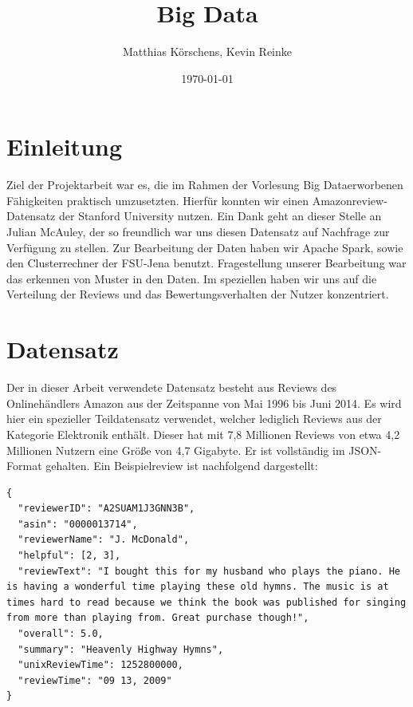 \documentclass{scrartcl}
\theoremstyle{my_th_style}
\begin{document}
\subject{Projektarbeit}%
\title{Big Data}%
\author{Matthias Körschens, Kevin Reinke}%
\date{\today}%
\maketitle%
\tableofcontents
\begingroup
\let\cleardoublepage\relax
\section{Einleitung}
Ziel der Projektarbeit war es, die im Rahmen der Vorlesung \glqq Big Data\grqq erworbenen Fähigkeiten praktisch umzusetzten. Hierfür konnten wir einen Amazonreview-Datensatz der Stanford University nutzen. Ein Dank geht an dieser Stelle an Julian McAuley, der so freundlich war uns diesen Datensatz auf Nachfrage zur Verfügung zu stellen. Zur Bearbeitung der Daten haben wir Apache Spark, sowie den Clusterrechner der FSU-Jena benutzt. Fragestellung unserer Bearbeitung war das erkennen von Muster in den Daten. Im speziellen haben wir uns auf die Verteilung der Reviews und das Bewertungsverhalten der Nutzer konzentriert.
\section{Datensatz}
Der in dieser Arbeit verwendete Datensatz besteht aus Reviews des Onlinehändlers Amazon aus der Zeitspanne von Mai 1996 bis Juni 2014. Es wird hier ein spezieller Teildatensatz verwendet, welcher lediglich Reviews aus der Kategorie Elektronik enthält. Dieser hat mit 7,8 Millionen Reviews von etwa 4,2 Millionen Nutzern eine Größe von 4,7 Gigabyte. Er ist vollständig im JSON-Format gehalten. Ein Beispielreview ist nachfolgend dargestellt:

\begin{lstlisting}[breaklines=true]
{ 
  "reviewerID": "A2SUAM1J3GNN3B", 
  "asin": "0000013714", 
  "reviewerName": "J. McDonald", 
  "helpful": [2, 3], 
  "reviewText": "I bought this for my husband who plays the piano. He is having a wonderful time playing these old hymns. The music is at times hard to read because we think the book was published for singing from more than playing from. Great purchase though!", 
  "overall": 5.0, 
  "summary": "Heavenly Highway Hymns", 
  "unixReviewTime": 1252800000, 
  "reviewTime": "09 13, 2009" 
}
\end{lstlisting}
\end{document}
